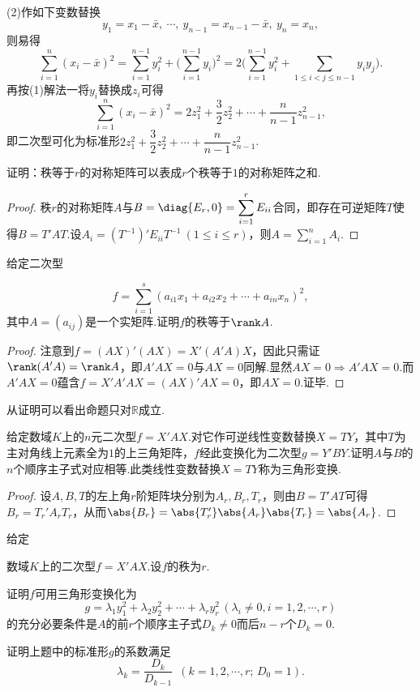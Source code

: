 \begin{sol}
	(2)作如下变数替换
	\[
		y_1=x_1-\bar{x},\ \cdots,\ y_{n-1}=x_{n-1}-\bar{x},\ y_n=x_n,
	\]
	则易得
	\[
		\sum_{i=1}^{n}(x_i-\bar{x})^2=\sum_{i=1}^{n-1}y_i^2+\biggl(\sum_{i=1}^{n-1}y_i\biggr)^2=2\biggl(\sum_{i=1}^{n-1}y_i^2+\sum_{1\le i<j\le n-1}y_iy_j\biggr).
	\]
	再按(1)解法一将$y_i$替换成$z_i$可得
	\[
		\sum_{i=1}^{n}(x_i-\bar{x})^2=2z_1^2+\frac{3}{2}z_2^2+\cdots+\frac{n}{n-1}z_{n-1}^2,
	\]
	即二次型可化为标准形$2z_1^2+\dfrac{3}{2}z_2^2+\cdots+\dfrac{n}{n-1}z_{n-1}^2$.
\end{sol}
\begin{prob}[6]
	证明：秩等于$r$的对称矩阵可以表成$r$个秩等于$1$的对称矩阵之和.
\end{prob}
\begin{proof}
	秩$r$的对称矩阵$A$与$B=\diag{E_r,0}=\displaystyle\sum_{i=1}^rE_{ii}$合同，即存在可逆矩阵$T$使得$B=T'AT$.设$A_i=(T^{-1})'E_{ii}T^{-1}\ (1\le i\le r)$，则$A=\displaystyle\sum_{i=1}^nA_i$.
\end{proof}
\begin{prob}[7]
	\hypertarget{RankOfOneDegreeHomogeneousQuadraticForm}{给定二次型}
	\[
		f=\sum_{i=1}^{s}(a_{i1}x_1+a_{i2}x_2+\cdots+a_{in}x_n)^2,
	\]
	其中$A=(a_{ij})$是一个实矩阵.证明$f$的秩等于$\rank A$.
\end{prob}
\begin{proof}
	注意到$f=(AX)'(AX)=X'(A'A)X$，因此只需证$\rank(A'A)=\rank A$，即$A'AX=0$与$AX=0$同解.显然$AX=0\Rightarrow A'AX=0$.而$A'AX=0$蕴含$f=X'A'AX=(AX)'AX=0$，即$AX=0$.证毕.
\end{proof}
\begin{note}
	从证明可以看出命题只对$\mathbb{R}$成立.
\end{note}
\begin{prob}[8]
	给定数域$K$上的$n$元二次型$f=X'AX$.对它作可逆线性变数替换$X=TY$，其中$T$为主对角线上元素全为$1$的上三角矩阵，$f$经此变换化为二次型$g=Y'BY$.证明$A$与$B$的$n$个顺序主子式对应相等.此类线性变数替换$X=TY$称为{\heiti 三角形变换}.
\end{prob}
\begin{proof}
	设$A,B,T$的左上角$r$阶矩阵块分别为$A_r,B_r,T_r$，则由$B=T'AT$可得$B_r=T_r'A_rT_r$，从而$\abs{B_r}=\abs{T_r'}\abs{A_r}\abs{T_r}=\abs{A_r	}$.
\end{proof}
\begin{prob}[9]
	\hypertarget{TriangleTransformation}{给定}数域$K$上的二次型$f=X'AX$.设$f$的秩为$r$.
	\begin{mylist}
		\item 证明$f$可用三角形变换化为
		\[
			g=\lambda_1y_1^2+\lambda_2y_2^2+\cdots+\lambda_ry_r^2\,(\lambda_i\ne0,i=1,2,\cdots,r)
		\]
		的充分必要条件是$A$的前$r$个顺序主子式$D_k\ne0$而后$n-r$个$D_k=0$.
		\item 证明上题中的标准形$g$的系数满足
		\[
			\lambda_k=\frac{D_k}{D_{k-1}}\enspace(k=1,2,\cdots,r;\,D_0=1).
		\]
	\end{mylist}
\end{prob}
